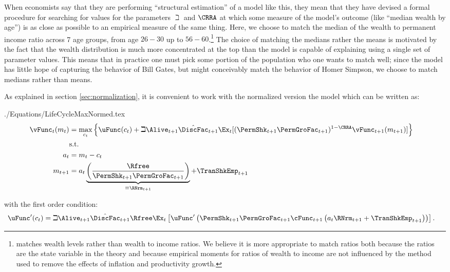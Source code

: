 \documentclass[titlepage, headings=optiontotocandhead]{\econtex}
\begin{document}
When economists say that they are performing ``structural estimation''
of a model like this, they mean that they have devised a
formal procedure for searching for values for the parameters ${\beth}$
and $\CRRA$ at which some measure of the model's outcome (like
``median wealth by age'') is as close as possible to an empirical measure
of the same thing. Here, we choose to match the median of the
wealth to permanent income ratio across 7 age groups, from age $26-30$
up to $56-60$.\footnote{\cite{cagettiWprofiles}
  matches wealth levels rather than wealth to income ratios. We
  believe it is more appropriate to match ratios both because the
  ratios are the state variable in the theory and because empirical
  moments for ratios of wealth to income are not influenced by the
  method used to remove the effects of inflation and productivity
  growth.} The choice of matching the medians rather the means is
motivated by the fact that the wealth distribution is much more
concentrated at the top than the model is capable of explaining using a single
set of parameter values.  This means that in practice one must pick
some portion of the population who one wants to match well; since the
model has little hope of capturing the behavior of Bill Gates, but
might conceivably match the behavior of Homer Simpson, we choose to
match medians rather than means.

As explained in section \ref{sec:normalization}, it is convenient to work with the normalized version the model which can be written as:
\begin{verbatimwrite}{./Equations/LifeCycleMaxNormed.tex}
  \begin{equation*}\begin{gathered}\begin{aligned}
        {\vFunc}_{t}({m}_{t})  & = \max_{{c}_{t}} \left\{\uFunc({c}_{t})+\beth\Alive_{t+1}\hat{\DiscFac}_{t+1}
          \Ex_{t}[(\PermShk_{t+1}\PermGroFac_{t+1})^{1-\CRRA}{\vFunc}_{t+1}({m}_{t+1})] \right\}   \\
        & \text{s.t.} &   \nonumber \\
        {a}_{t}    & = {m}_{t}-{c}_{t} \nonumber
        \\      {m}_{t+1}  & = {a}_{t}\underbrace{\left(\frac{\Rfree}{\PermShk_{t+1}\PermGroFac_{t+1}}\right)}_{\equiv \RNrm_{t+1}}+\TranShkEmp_{t+1}
      \end{aligned}\end{gathered}\end{equation*}
\end{verbatimwrite}
\unskip
with the first order condition:
\begin{equation}\begin{gathered}\begin{aligned}
      \uFunc^{\prime}({c}_{t}) & = \beth\Alive_{t+1}\hat{\DiscFac}_{t+1}\Rfree \Ex_{t}\left[\uFunc^{\prime}\left(\PermShk_{t+1}\PermGroFac_{t+1}\cFunc_{t+1}\left({a}_{t}\RNrm_{t+1}+\TranShkEmp_{t+1}\right)\right)\right]\label{eq:FOCLifeCycle}
      .
    \end{aligned}\end{gathered}\end{equation}
\end{document}
